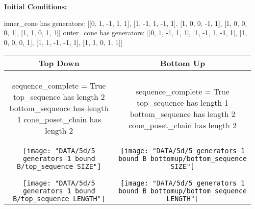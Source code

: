 \documentclass[10pt]{article}
\begin{document}
\textbf{Initial Conditions:}
\begin{SAGE}
inner_cone has generators: 
[[0, 1, -1, 1, 1], [1, -1, 1, -1, 1], [1, 0, 0, -1, 1], [1, 0, 0, 0, 1], [1, 1, 0, 1, 1]]
outer_cone has generators: 
[[0, 1, -1, 1, 1], [1, -1, 1, -1, 1], [1, 0, 0, 0, 1], [1, 1, -1, -1, 1], [1, 1, 0, 1, 1]]

\end{SAGE}
\begin{tabular}{c|c}
\textbf{Top Down} & \textbf{Bottom Up} \\ \hline  
\begin{SAGE}
sequence_complete = True
top_sequence has length 2
bottom_sequence has length 1
cone_poset_chain has length 2
\end{SAGE} 
&
\begin{SAGE}
sequence_complete = True
top_sequence has length 1
bottom_sequence has length 2
cone_poset_chain has length 2
\end{SAGE} 
\\ \hline

\begin{minipage}{.45\textwidth}
\texttt{[image: "DATA/5d/5 generators 1 bound B/top\_sequence SIZE"]}
\end{minipage} &
\begin{minipage}{.45\textwidth}
\texttt{[image: "DATA/5d/5 generators 1 bound B bottomup/bottom\_sequence SIZE"]}
\end{minipage} \\ \\
\hline \\\begin{minipage}{.45\textwidth}
\texttt{[image: "DATA/5d/5 generators 1 bound B/top\_sequence LENGTH"]}
\end{minipage} &
\begin{minipage}{.45\textwidth}
\texttt{[image: "DATA/5d/5 generators 1 bound B bottomup/bottom\_sequence LENGTH"]}
\end{minipage}
\end{tabular}
\end{document}

